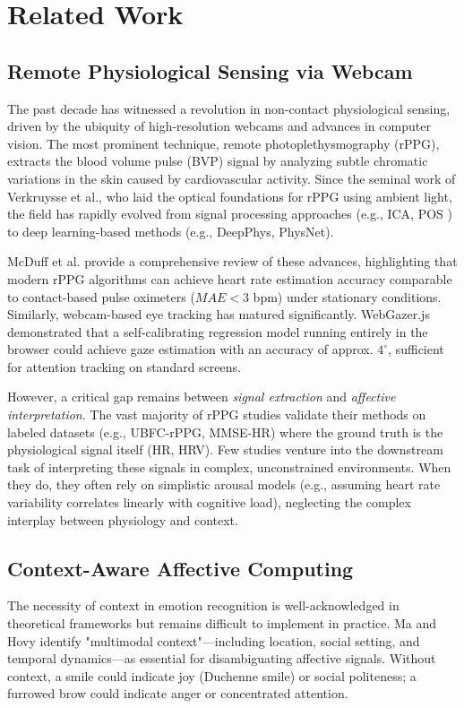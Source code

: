 \section{Related Work}

\subsection{Remote Physiological Sensing via Webcam}
The past decade has witnessed a revolution in non-contact physiological sensing, driven by the ubiquity of high-resolution webcams and advances in computer vision. The most prominent technique, remote photoplethysmography (rPPG), extracts the blood volume pulse (BVP) signal by analyzing subtle chromatic variations in the skin caused by cardiovascular activity. Since the seminal work of Verkruysse et al., who laid the optical foundations for rPPG using ambient light, the field has rapidly evolved from signal processing approaches (e.g., ICA, POS \cite{wang_pos}) to deep learning-based methods (e.g., DeepPhys, PhysNet).

McDuff et al. \cite{mcduff_rppg} provide a comprehensive review of these advances, highlighting that modern rPPG algorithms can achieve heart rate estimation accuracy comparable to contact-based pulse oximeters ($MAE < 3$ bpm) under stationary conditions. Similarly, webcam-based eye tracking has matured significantly. WebGazer.js \cite{webgazer} demonstrated that a self-calibrating regression model running entirely in the browser could achieve gaze estimation with an accuracy of approx. $4^{\circ}$, sufficient for attention tracking on standard screens.

However, a critical gap remains between \textit{signal extraction} and \textit{affective interpretation}. The vast majority of rPPG studies validate their methods on labeled datasets (e.g., UBFC-rPPG, MMSE-HR) where the ground truth is the physiological signal itself (HR, HRV). Few studies venture into the downstream task of interpreting these signals in complex, unconstrained environments. When they do, they often rely on simplistic arousal models (e.g., assuming heart rate variability correlates linearly with cognitive load), neglecting the complex interplay between physiology and context.

\subsection{Context-Aware Affective Computing}
The necessity of context in emotion recognition is well-acknowledged in theoretical frameworks but remains difficult to implement in practice. Ma and Hovy \cite{context_aware_ac} identify "multimodal context"—including location, social setting, and temporal dynamics—as essential for disambiguating affective signals. Without context, a smile could indicate joy (Duchenne smile) or social politeness; a furrowed brow could indicate anger or concentrated attention.

